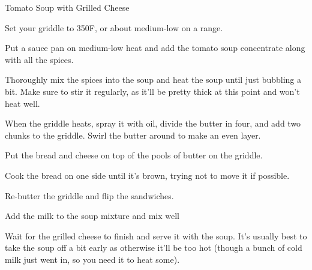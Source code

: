 \documentclass{recipe}
\begin{document}
\begin{recipe}{Tomato Soup with Grilled Cheese}
  \begin{steps}
  \item Set your griddle to 350\degree F, or about medium-low on a
    range.
  \item Put a sauce pan on medium-low heat and add the tomato soup
    concentrate along with all the spices.
  \item Thoroughly mix the spices into the soup and heat the soup
    until just bubbling a bit.  Make sure to stir it regularly, as
    it'll be pretty thick at this point and won't heat well.
  \item When the griddle heats, spray it with oil, divide the butter
    in four, and add two chunks to the griddle.  Swirl the butter
    around to make an even layer.
  \item Put the bread and cheese on top of the pools of butter on the
    griddle.
  \item Cook the bread on one side until it's brown, trying not to
    move it if possible.
  \item Re-butter the griddle and flip the sandwiches.
  \item Add the milk to the soup mixture and mix well
  \item Wait for the grilled cheese to finish and serve it with the
    soup.  It's usually best to take the soup off a bit early as
    otherwise it'll be too hot (though a bunch of cold milk just went
    in, so you need it to heat some).
  \end{steps}
\end{recipe}
\end{document}
